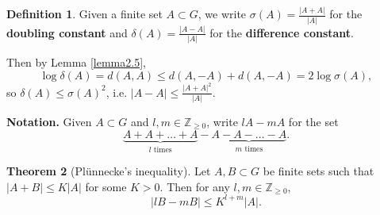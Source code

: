 \documentclass{article}
\theoremstyle{definition}
\newtheorem{theorem}{Theorem}[section]
\newtheorem{defn}[theorem]{Definition}
\begin{document}
\begin{defn}
    Given a finite set $A \subset G$, we write $\sigma(A) = \frac{\left|A+A\right|}{\left|A\right|}$ for the \textbf{doubling constant} and $\delta(A)=\frac{\left|A-A\right|}{\left|A\right|}$ for the \textbf{difference constant}.
\end{defn}
Then by Lemma \ref{lemma2.5}, \[
\log \delta(A) = d(A,A) \le d(A,-A) + d(A,-A) = 2 \log \sigma(A),
\]
so $\delta(A) \le \sigma(A)^2$, i.e. $\left|A-A\right|\le \frac{\left|A+A\right|^2}{\left|A\right|}$.
\vspace{1mm}

\textbf{Notation.} Given $A \subset G$ and $l,m \in \mathbb{Z}_{\ge 0}$, write $lA-mA$ for the set \[
\underbrace{A + A + \ldots + A}_{l \text{ times}} - \underbrace{A - A - \ldots - A}_{m \text{ times}}.
\]
\begin{theorem}[Plünnecke's inequality]
    Let $A,B \subset G$ be finite sets such that $\left|A+B\right| \le K\left|A\right|$ for some $K>0$. Then for any $l,m \in \mathbb{Z}_{\ge 0}$,
    \[
    \left|lB-mB\right|\le K^{l+m}\left|A\right|.
    \]
\end{theorem}
\end{document}
